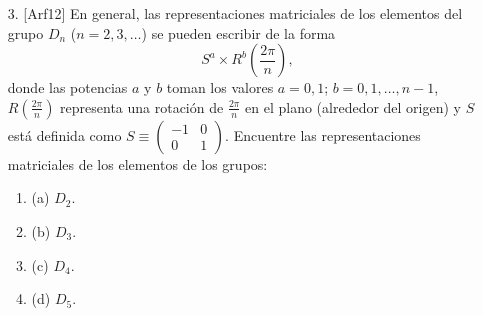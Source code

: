 \documentclass[a4paper,12pt]{article}
\begin{document}
\newpage

\begin{enumerate}
    \item [3.] [Arf12] En general, las representaciones matriciales de los elementos del grupo $D_n$ ($n = 2, 3, \ldots$) se pueden escribir de la forma
    $$
    S^a \times R^b\left(\frac{2\pi}{n}\right),
    $$
    donde las potencias $a$ y $b$ toman los valores $a = 0, 1$; $b = 0, 1, \ldots, n-1$, $R\left(\frac{2\pi}{n}\right)$ representa una rotación de $\frac{2\pi}{n}$ en el plano (alrededor del origen) y $S$ está definida como $S \equiv \begin{pmatrix} -1 & 0 \\ 0 & 1 \end{pmatrix}$. Encuentre las representaciones matriciales de los elementos de los grupos:
    \begin{enumerate}
        \item (a) $D_2$.
        \item (b) $D_3$.
        \item (c) $D_4$.
        \item (d) $D_5$.
    \end{enumerate}
\end{enumerate}
\end{document}
